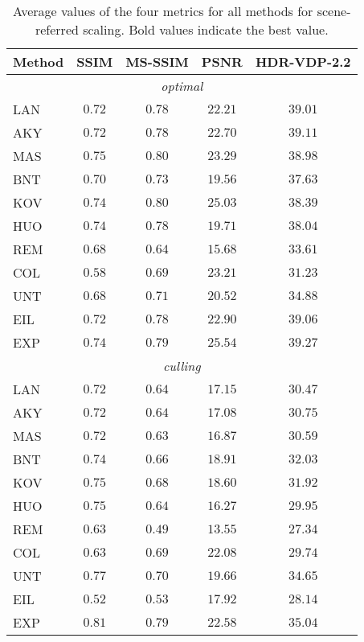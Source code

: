 \documentclass{egpubl}
\newcommand\la[1]{\multicolumn{1}{l}{#1}}
\begin{document}
\begin{table}[tbp]
    \caption{Average values of the four metrics for all methods for
    scene-referred scaling. Bold values indicate the best
    value.}\label{table:resultsscene}
    \centering
    \begin{tabular}{lcccc}
        \toprule
        \la{{Method}}&SSIM&MS-SSIM&PSNR&HDR-VDP-2.2\\\midrule
        \multicolumn{5}{c}{\textit{optimal}} \\\midrule
\la{LAN}&$0.72$&$0.78$&$22.21$&$39.01$\\
        \la{AKY}&$0.72$&$0.78$&$22.70$&$39.11$\\
        \la{MAS}&$\mathbf{0.75}$&$\mathbf{0.80}$&$23.29$&$38.98$\\
        \la{BNT}&$0.70$&$0.73$&$19.56$&$37.63$\\
        \la{KOV}&$0.74$&$\mathbf{0.80}$&$25.03$&$38.39$\\
        \la{HUO}&$0.74$&$0.78$&$19.71$&$38.04$\\
        \la{REM}&$0.68$&$0.64$&$15.68$&$33.61$\\
        \la{COL}&$0.58$&$0.69$&$23.21$&$31.23$\\
        \la{UNT}&$0.68$&$0.71$&$20.52$&$34.88$\\
        \la{EIL}&$0.72$&$0.78$&$22.90$&$39.06$\\
        \la{EXP}&$0.74$&$0.79$&$\mathbf{25.54}$&$\mathbf{39.27}$\\\midrule
\multicolumn{5}{c}{\textit{culling}} \\\midrule
        \la{LAN}&$0.72$&$0.64$&$17.15$&$30.47$\\
\la{AKY}&$0.72$&$0.64$&$17.08$&$30.75$\\
        \la{MAS}&$0.72$&$0.63$&$16.87$&$30.59$\\
        \la{BNT}&$0.74$&$0.66$&$18.91$&$32.03$\\
        \la{KOV}&$0.75$&$0.68$&$18.60$&$31.92$\\
        \la{HUO}&$0.75$&$0.64$&$16.27$&$29.95$\\
        \la{REM}&$0.63$&$0.49$&$13.55$&$27.34$\\
        \la{COL}&$0.63$&$0.69$&$22.08$&$29.74$\\
        \la{UNT}&$0.77$&$0.70$&$19.66$&$34.65$\\
        \la{EIL}&$0.52$&$0.53$&$17.92$&$28.14$\\
        \la{EXP}&$\mathbf{0.81}$&$\mathbf{0.79}$&$\mathbf{22.58}$&$\mathbf{35.04}$\\
        \bottomrule
    \end{tabular}
\end{table}
\end{document}
